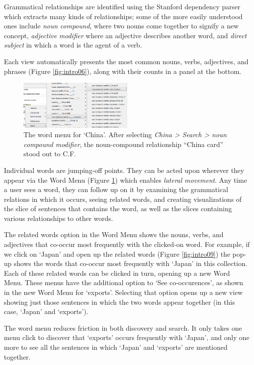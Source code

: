 \documentclass{sig-alternate}
\begin{document}
 Grammatical relationships are identified using the Stanford dependency parser\cite{klein_accurate_2003} which extracts many kinds of relationships; some of the more easily understood ones include \emph{noun compound}, where two nouns come together to signify a new concept, \emph{adjective modifier} where an adjective describes another word, and \emph{direct subject} in which a word is the agent of a verb. 

Each view automatically presents the most common nouns, verbs, adjectives, and phrases (Figure \ref{fig:intro06}),  along with their counts in a panel at the bottom.

\begin{figure}[h!]
\includegraphics[width=0.5\textwidth]{fig/chris/01.png}
\caption{The word menu for `China'.   After selecting \emph{China > Search > noun compound modifier}, the noun-compound relationship ``China card'' stood out to C.F. \label{fig:chris01}}
\end{figure}

Individual words are jumping-off points. They can be acted upon wherever they appear via the Word Menu (Figure \ref{fig:chris01}) which enables  \emph{lateral movement}.  Any time a user sees a word, they can follow up on it by examining the grammatical relations in which it occurs, seeing related words,  and creating visualizations of the slice of sentences that contains the word, as well as the slices containing various relationships to other words.

The related words option in the Word Menu shows the nouns, verbs, and adjectives that co-occur most frequently with the clicked-on word. For example, if we click on `Japan' and open up the related words (Figure \ref{fig:intro09}) the pop-up shows the words that co-occur most frequently with `Japan' in this collection. Each of these related words can be clicked in turn, opening up a new Word Menu. These menus have the additional option to `See co-occurences', as shown in the new Word Menu for `exports'.  Selecting that option opens up a new view showing just those sentences in which the two words appear together  (in this case, `Japan' and `exports').  

The word menu reduces friction in both discovery and search. It only takes one menu click to discover that `exports' occurs frequently with `Japan', and only one more to see all the sentences in which `Japan' and `exports' are mentioned together.  
\end{document}
